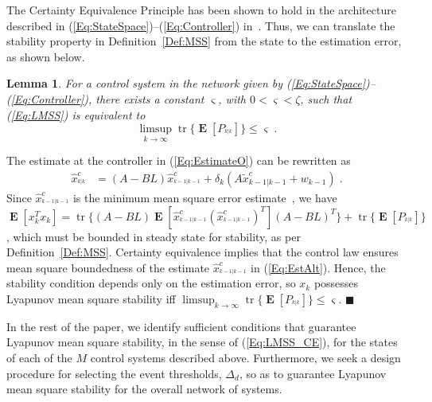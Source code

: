 \documentclass[twocolumn]{autart}
\DeclareMathOperator*{\E}{{\mathbf E}}        \let\Pr\undefined \DeclareMathOperator{\Pr}{{\mathbf P}}        \DeclareMathOperator*{\argmax}{arg\,max}
\DeclareMathOperator{\tr}{tr}
\newtheorem{lemma}[theorem]{Lemma}
\newenvironment{proof}[1][Proof]{\begin{trivlist}
\item[\hskip \labelsep {\bfseries #1}]}{\end{trivlist}}
\renewcommand{\qed}{$\blacksquare$}
\begin{document}
The Certainty Equivalence Principle has been shown to hold in the architecture described in (\ref{Eq:StateSpace})--(\ref{Eq:Controller}) in~\cite{Ramesh2013}. Thus, we can translate the stability property in Definition~\ref{Def:MSS} from the state to the estimation error, as shown below.
\begin{lemma} \label{Lemma:Lyapunov mean square stability_CE}
For a control system in the network given by (\ref{Eq:StateSpace})--(\ref{Eq:Controller}), there exists a constant $\varsigma$, with $0 < \varsigma < \zeta$, such that (\ref{Eq:LMSS}) is equivalent to
\begin{equation} \label{Eq:LMSS_CE}
\limsup_{k \rightarrow \infty} \tr\{\E[P_{^{k|k}}]\} \le \varsigma \; .
\end{equation}
\end{lemma}
\begin{proof}
The estimate at the controller in (\ref{Eq:EstimateO}) can be rewritten as
\begin{align}
\hat{x}^c_{^{k|k}} &= (A-BL) \hat{x}^c_{^{k-1|k-1}} + \delta_k (A \tilde{x}^c_{k-1|k-1} + w_{k-1}) \; . \label{Eq:EstAlt}
\end{align}
Since $\hat{x}^c_{^{k-1|k-1}}$ is the minimum mean square error estimate~\cite{Ramesh2013}, we have $\E[x_k^T x_k] = \tr\{(A-BL) \E[\hat{x}^{c}_{^{k-1|k-1}} (\hat{x}^{c}_{^{k-1|k-1}})^{T}] (A-BL)^T\} + \tr\{\E[P_{^{k|k}}]\}$, which must be bounded in steady state for stability, as per Definition~\ref{Def:MSS}. Certainty equivalence implies that the control law ensures mean square boundedness of the estimate $\hat{x}^c_{^{k-1|k-1}}$ in (\ref{Eq:EstAlt}). Hence, the stability condition depends only on the estimation error, so $x_k$ possesses Lyapunov mean square stability iff $\limsup_{k \rightarrow \infty} \tr\{\E[P_{^{k|k}}]\} \le \varsigma$. \hfill \qed
\end{proof}
In the rest of the paper, we identify sufficient conditions that guarantee Lyapunov mean square stability, in the sense of (\ref{Eq:LMSS_CE}), for the states of each of the $M$ control systems described above. Furthermore, we seek a design procedure for selecting the event thresholds, $\Delta_d$, so as to guarantee Lyapunov mean square stability for the overall network of systems.
\end{document}
